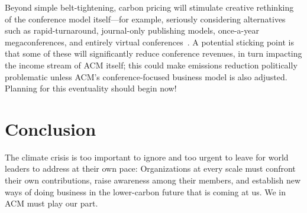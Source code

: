 \documentclass[12pt]{article}
\newcommand{\bcp}[1]{\ifdraft{\bf [bcp: #1]}\fi}
\newcommand{\SECTION}{\section*}
\begin{document}
Beyond simple belt-tightening, carbon pricing will stimulate creative
rethinking of the conference model 
itself---for example, seriously considering alternatives such as
rapid-turnaround, journal-only publishing models, once-a-year
megaconferences, and entirely virtual conferences~\cite{NCN}.
%
A potential sticking point is that some of these will significantly reduce
conference revenues, in turn impacting the income stream of ACM itself; this
could make emissions reduction politically problematic unless ACM's
conference-focused business model is also adjusted.  Planning for this
eventuality should begin now!





\SECTION{Conclusion}


The climate crisis is too important to ignore and too urgent to leave for
world leaders to address at their own pace: Organizations at every scale
must confront their own contributions, raise awareness among their members,
and establish new ways of doing business in the lower-carbon future that is
coming at us.  We in ACM must play our part.





\end{document}
